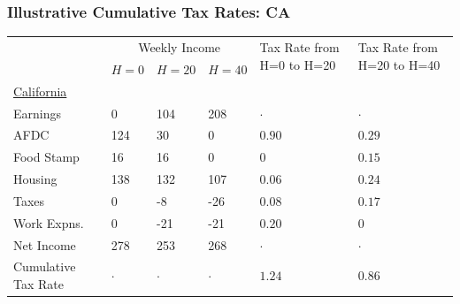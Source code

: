 \documentclass{beamer}
\begin{document}
\begin{frame}
\frametitle[alignment=center]{Illustrative Cumulative Tax Rates: CA}
\begin{table}
\centering
\begin{tabular}{p{2cm}p{1.3cm}p{1.3cm}p{1.3cm}p{1.5cm}p{1.5cm}}
 &  \multicolumn{3}{c}{Weekly Income} & \multirow{3}{*}{\parbox{1.5cm}{Tax Rate from H=0 to H=20}} & \multirow{3}{*}{\parbox{1.5cm}{Tax Rate from H=20 to H=40}} \\
 \cline{2-4}
  &  \multirow{3}{*}{$H=0$} & \multirow{3}{*}{$H=20$} & \multirow{3}{*}{$H=40$} & &  \\
  & & & & \\
    & & & & \\
\hline
\underline{California} &  &  &  &  &  \\
Earnings & 0 & 104 & 208 & $\cdot$ & $\cdot$\\ 
AFDC & 124 & 30 & 0 & $0.90$ & $0.29$\\ 
Food Stamp & 16 & 16 & 0 & $0$ & $0.15$\\ 
Housing  & 138 & 132 & 107 & $0.06$ & $0.24$\\ 
Taxes & 0 & -8 & -26 & $0.08$ & $0.17$\\ 
Work Expns. & 0 & -21 & -21 & $0.20$ & $0$\\ 
Net Income & 278 & 253 & 268 & $\cdot$ & $\cdot$\\ 
\multirow{2}{*}{\parbox{2cm}{Cumulative Tax Rate}} & \multirow{2}{*}{$\cdot$} & \multirow{2}{*}{$\cdot$} & \multirow{2}{*}{$\cdot$} & \multirow{2}{*}{$1.24$} & \multirow{2}{*}{$0.86$}\\
\end{tabular}
\end{table}
\end{frame}
\end{document}

